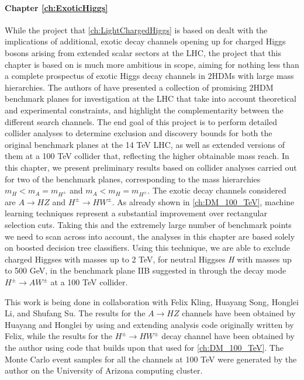 \paragraph{Chapter \ref{ch:ExoticHiggs}}
While the project that \autoref{ch:LightChargedHiggs} is based on dealt with the implications of additional, exotic decay channels opening up for charged Higgs bosons arising from extended scalar sectors at the LHC, the project that this chapter is based on is much more ambitious in scope, aiming for nothing less than a complete prospectus of exotic Higgs decay channels in $2$HDMs with large mass hierarchies. The authors of \citep{Kling2016} have presented a collection of promising $2$HDM benchmark planes for investigation at the LHC that take into account theoretical and experimental constraints, and highlight the complementarity between the different search channels. The end goal of this project is to perform detailed collider analyses to determine exclusion and discovery bounds for both the original benchmark planes at the 14 TeV LHC, as well as extended versions of them at a 100 TeV collider that, reflecting the higher obtainable mass reach. In this chapter, we present preliminary results based on collider analyses carried out for two of the benchmark planes, corresponding to the mass hierarchies $m_H < m_A = m_{H^\pm}$ and $m_A < m_H = m_{H^\pm}$. The exotic decay channels considered are $A\rightarrow HZ$ and $H^\pm\rightarrow HW^\pm$. As already shown in \autoref{ch:DM_100_TeV}, machine learning techniques represent a substantial improvement over rectangular selection cuts. Taking this and the extremely large number of benchmark points we need to scan across into account, the analyses in this chapter are based solely on boosted decision tree classifiers. Using this technique, we are able to exclude charged Higgses with masses up to 2 TeV, for neutral Higgses \emph{H} with masses up to 500 GeV, in the benchmark plane IIB suggested in \cite{Kling2016} through the decay mode $H^\pm\rightarrow AW^\pm$ at a 100 TeV collider.

This work is being done in collaboration with Felix Kling, Huayang Song, Honglei Li, and Shufang Su. The results for the $A\rightarrow HZ$ channels have been obtained by Huayang and Honglei by using and extending analysis code originally written by Felix, while the results for the $H^\pm\rightarrow HW^\pm$ decay channel have been obtained by the author using code that builds upon that used for \autoref{ch:DM_100_TeV}. The Monte Carlo event samples for all the channels at 100 TeV were generated by the author on the University of Arizona computing cluster.

